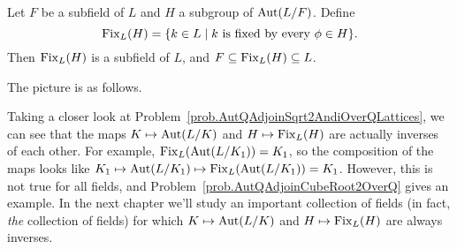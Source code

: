 \begin{theorem}\label{thm.SubgroupAutLOverKYieldsSubfield}
Let $F$ be a subfield of $L$ and  $H$  a subgroup of $\operatorname{Aut}(L/F)$. Define \[\operatorname{Fix}_L(H) = \{k\in L \mid \text{$k$ is fixed by every $\phi \in H$}\}.\] Then $\operatorname{Fix}_L(H)$ is a subfield of $L$, and $F\subseteq \operatorname{Fix}_L(H) \subseteq L$.
\end{theorem}

The picture is as follows.
\begin{center}
\end{center}


Taking a closer look at Problem~\ref{prob.AutQAdjoinSqrt2AndiOverQLattices}, we can see that the maps $K \mapsto \operatorname{Aut}(L/K)$ and $H \mapsto \operatorname{Fix}_L(H)$ are actually inverses of each other. For example, $\operatorname{Fix}_L(\operatorname{Aut}(L/K_1)) = K_1$, so the composition of the maps looks like $K_1 \mapsto \operatorname{Aut}(L/K_1) \mapsto \operatorname{Fix}_L(\operatorname{Aut}(L/K_1)) = K_1$. However, this is not true for all fields, and Problem~\ref{prob.AutQAdjoinCubeRoot2OverQ} gives an example. In the next chapter we'll study an important collection of fields (in fact, \emph{the} collection of fields) for which $K \mapsto \operatorname{Aut}(L/K)$ and $H \mapsto \operatorname{Fix}_L(H)$ are always inverses.


